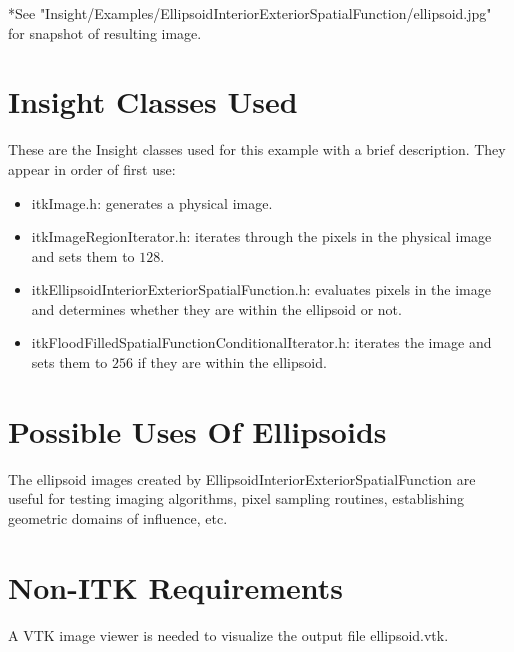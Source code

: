 \documentclass{InsightHowto}
\begin{document}
*See "Insight/Examples/EllipsoidInteriorExteriorSpatialFunction/ellipsoid.jpg" for snapshot
of resulting image.

\section{Insight Classes Used}

These are the Insight classes used for this example with a brief description. They appear in
order of first use:

\begin{itemize}
\item itkImage.h: generates a physical image.
\item itkImageRegionIterator.h: iterates through the pixels in the physical image and sets
them to $128$.
\item itkEllipsoidInteriorExteriorSpatialFunction.h: evaluates pixels in the image and determines whether they are within the ellipsoid or
not.
\item itkFloodFilledSpatialFunctionConditionalIterator.h: iterates the image and sets them to $256$ if they are within the
ellipsoid.
\end{itemize}

\section{Possible Uses Of Ellipsoids}
The ellipsoid images created by EllipsoidInteriorExteriorSpatialFunction are useful for
testing imaging algorithms, pixel sampling routines, establishing geometric domains of
influence, etc.

\section{Non-ITK Requirements}
A VTK image viewer is needed to visualize the output file ellipsoid.vtk.
\end{document}
